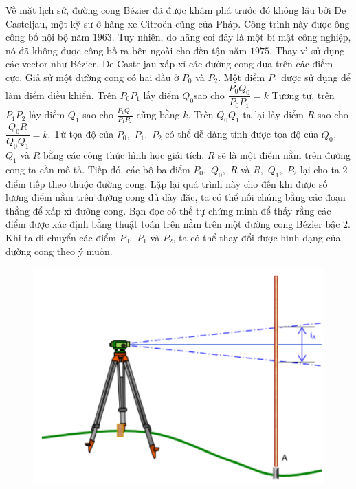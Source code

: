 \begin{multicols}{2}
\begin{figure}[H]
		\vspace*{-10pt}
	\end{figure}
	\vskip 0.1cm
	\vskip 0.1cm
	Về mặt lịch sử, đường cong Bézier đã được khám phá trước đó không lâu bởi De Casteljau, một kỹ sư ở hãng xe Citroën cũng của Pháp. Công trình này được ông công bố nội bộ năm $1963$. Tuy nhiên, do hãng coi đây là một bí mật công nghiệp, nó đã không được công bố ra bên ngoài cho đến tận năm $1975$.
	\vskip 0.1cm
	Thay vì sử dụng các vector như Bézier, De Casteljau xấp xỉ các đường cong dựa trên các điểm cực. Giả sử một đường cong có hai đầu ở $P_0$ và $P_2$. Một điểm $P_1$ được sử dụng để làm điểm điều khiển. Trên $P_0 P_1$ lấy điểm $Q_0$sao cho $\dfrac{P_0Q_0}{P_0P_1} = k$ Tương tự, trên $P_1 P_2$ lấy điểm $Q_1$ sao cho $\frac{P_1 Q_1}{P_1 P_2}$ cũng bằng $k$. Trên $Q_0 Q_1$ ta lại lấy điểm $R$ sao cho $\dfrac{Q_0 R}{Q_0 Q_1} = k$. Từ tọa độ của $P_0,$ $P_1,$ $P_2$ có thể dễ dàng tính được tọa độ của $Q_0,$ $Q_1$ và $R$ bằng các công thức hình học giải tích. $R$ sẽ là một điểm nằm trên đường cong ta cần mô tả. Tiếp đó, các bộ ba điểm $P_0,$ $Q_0,$ $R$ và $R,$ $Q_1,$ $P_2$ lại cho ta $2$ điểm tiếp theo thuộc đường cong. Lặp lại quá trình này cho đến khi được số lượng điểm nằm trên đường cong đủ dày đặc, ta có thể nối chúng bằng các đoạn thẳng để xấp xỉ đường cong. Bạn đọc có thể tự chứng minh để thấy rằng các điểm được xác định bằng thuật toán trên nằm trên một đường cong Bézier bậc $2$. Khi ta di chuyển các điểm $P_0,$ $P_1$  và $P_2$, ta có thể thay đổi được hình dạng của đường cong theo ý muốn.
	\begin{figure}[H]
		\vspace*{-5pt}
		\centering
		\captionsetup{labelformat= empty, justification=centering}
		\includegraphics[width= 0.9\linewidth]{4}

\end{figure}
\end{multicols}
